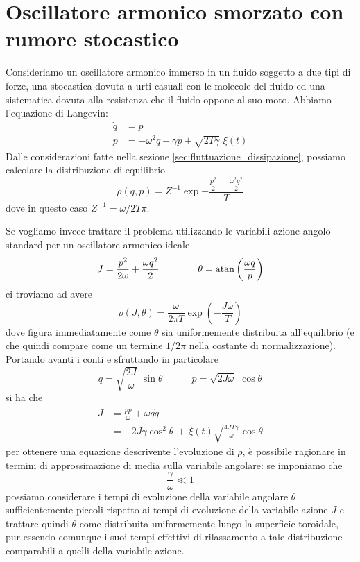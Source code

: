 \documentclass[10pt,a4paper]{article}
\begin{document}
\section{Oscillatore armonico smorzato con rumore stocastico}
Consideriamo un oscillatore armonico immerso in un fluido soggetto a due tipi di forze, una stocastica dovuta a urti casuali con le molecole del fluido ed una sistematica dovuta alla resistenza che il fluido oppone al suo moto. Abbiamo l'equazione di Langevin:
\begin{align}
	\dot{q} &= p\\
	\dot{p} &= -\omega^2 q - \gamma p + \sqrt{2T\gamma}\,\,\xi(t)
\end{align}
Dalle considerazioni fatte nella sezione \ref{sec:fluttuazione_dissipazione}, possiamo calcolare la distribuzione di equilibrio
\begin{equation}
	\rho(q,p) = Z^{-1} \exp{-\frac{\frac{p^2}{2}+\frac{\omega^2q^2}{2}}{T}}
\end{equation}
dove in questo caso \(Z^{-1}=\omega/2T\pi\).

Se vogliamo invece trattare il problema utilizzando le variabili azione-angolo standard per un oscillatore armonico ideale
\begin{equation}
	J = \frac{p^2}{2\omega} + \frac{\omega q^2}{2} \quad\quad\quad\quad \theta = \atan\left(\frac{\omega q}{p}\right)
\end{equation}
ci troviamo ad avere
\begin{equation}
	\rho(J, \theta) = \frac{\omega}{2\pi T} \exp\left(-\frac{J\omega}{T}\right)
\end{equation}
dove figura immediatamente come \(\theta\) sia uniformemente distribuita all'equilibrio (e che quindi compare come un termine \(1/2\pi\) nella costante di normalizzazione).\\
Portando avanti i conti e sfruttando in particolare
\begin{equation}
	q = \sqrt{\frac{2J}{\omega}}\,\,\sin{\theta} \quad\quad\quad p = \sqrt{2J\omega}\,\,\cos{\theta}
\end{equation}
si ha che
\begin{align}
	\dot{J} &= \frac{p\dot{p}}{\omega} + \omega q\dot{q}\\
	&= -2J\gamma \cos^2\theta \,+\, \xi(t)\sqrt{\frac{4JT\gamma}{\omega}}\cos\theta
\end{align}
per ottenere una equazione descrivente l'evoluzione di \(\rho\), è possibile ragionare in termini di approssimazione di media sulla variabile angolare: se imponiamo che
\begin{equation}
	\frac{\gamma}{\omega} \ll 1
\end{equation}
possiamo considerare i tempi di evoluzione della variabile angolare \(\theta \) sufficientemente piccoli rispetto ai tempi di evoluzione della variabile azione \(J\) e trattare quindi \(\theta \) come distribuita uniformemente lungo la superficie toroidale, pur essendo comunque i suoi tempi effettivi di rilassamento a tale distribuzione comparabili a quelli della variabile azione. 
\end{document}
